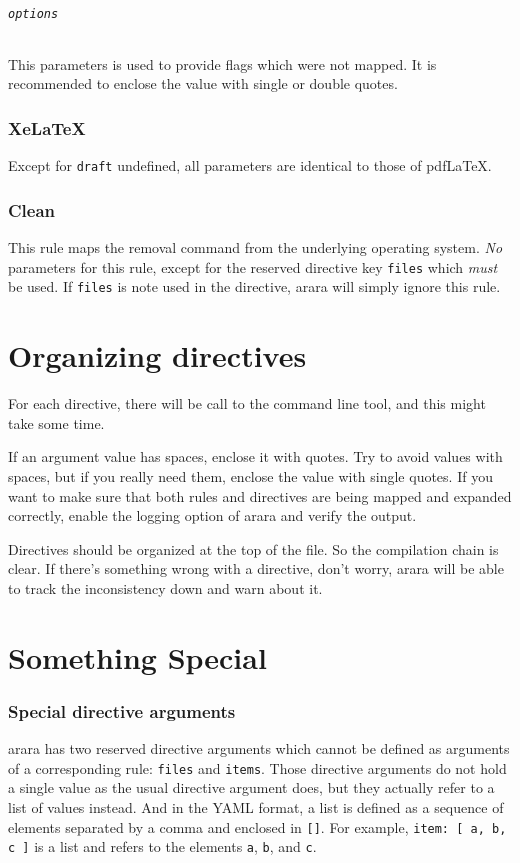 \documentclass[a4paper]{article}
\begin{document}
\paragraph{\texttt{options}}
This parameters is used to provide flags which were not mapped. It is recommended to enclose the value with single or double quotes.
\section{XeLaTeX}
Except for \verb|draft| undefined, all parameters are identical to those of pdf\LaTeX.
\section{Clean}
This rule maps the removal command from the underlying operating system. \emph{No} parameters for this rule, except for the reserved directive key \verb|files| which \emph{must} be used. If \verb|files| is note used in the directive, arara will simply ignore this rule. 
\part{Organizing directives}
For each directive, there will be call to the command line tool, and this might take some time.

If an argument value has spaces, enclose it with quotes. Try to avoid values with spaces, but if you really need them, enclose the value with single quotes. If you want to make sure that both rules and directives are being mapped and expanded correctly, enable the logging option of arara and verify the output.

Directives should be organized at the top of the file. So the compilation chain is clear. If there's something wrong with a directive, don't worry, arara will be able to track the inconsistency down and warn about it.
\part{Something Special}
\section{Special directive arguments}
arara has two reserved directive arguments which cannot be defined as arguments of a corresponding rule: \verb|files| and \verb|items|.
Those directive arguments do not hold a single value as the usual directive argument does, but they actually refer to a list of values instead. And in the YAML format, a list is defined as a sequence of elements separated by a comma and enclosed in \verb|[]|.
For example, \verb|item: [ a, b, c ]| is a list and refers to the elements \verb|a|, \verb|b|, and \verb|c|. 
\end{document}
